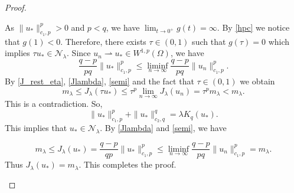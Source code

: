 \documentclass[pdflatex,sn-mathphys-num]{sn-jnl}
\theoremstyle{thmstyleone}%
\theoremstyle{thmstyletwo}%
\theoremstyle{thmstylethree}%
\theoremstyle{thmstylethree}%
\begin{document}
\begin{proof}
\begin{itemize}
As $\|u_*\|_{c_1,p}^p>0$ and $p<q$, we have $\lim_{t \rightarrow 0^{+}}g(t)=\infty$.  By \eqref{hpc} we notice that $g(1)<0$. Therefore, there exists $\tau \in(0,1)$ such that $g(\tau)=0$ which implies $\tau u_{*} \in \mathcal{N}_{\lambda}$.
Since $u_{n} \rightharpoonup u_{*} \in W^{1,p}(\Omega)$, we have 
\begin{equation}\label{semi}
    \frac{q-p}{pq}\|u_*\|_{c_1,p}^p \leqslant \liminf_{n\to \infty} \frac{q-p}{pq}\|u_n\|_{c_1,p}^p .
\end{equation}
By \eqref{J_rest_eta}, \eqref{Jlambda}, \eqref{semi} and the fact that $\tau\in (0,1)$ we obtain
$$
m_{\lambda} \leqslant J_{\lambda}\left(\tau u_{*}\right)
\leqslant \tau^{p} \lim _{n \rightarrow \infty} J_{\lambda}\left(u_{n}\right)=\tau^{p} m_{\lambda}<m_{\lambda}.
$$
This is a contradiction. So, 
\begin{equation*}\label{deskp}
\|u_*\|_{c_1,p}^p+\|u_* \|_{c_2,q}^q=\lambda K_q(u_{*}).
\end{equation*}
This implies that  $u_{*}\in \mathcal{N}_{\lambda}$.  By \eqref{Jlambda} and \eqref{semi}, we have

$$m_{\lambda} \leqslant J_{\lambda}\left(u_{*}\right)= \frac{q-p}{q p} \|u_*\|_{c_1,p}^p \leqslant \liminf_{n\to \infty} \frac{q-p}{pq}\|u_n\|_{c_1,p}^p = m_{\lambda}.
$$
Thus $J_{\lambda}\left(u_{*}\right)=m_{\lambda}$. This completes the proof.
\end{itemize}
\end{proof}
\end{document}
